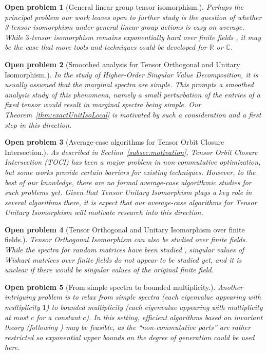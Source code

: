 \documentclass[11pt]{article}
\numberwithin{equation}{section}
\newtheorem{openproblem}{\bf Open problem}
\theoremstyle{remark}
\newcommand{\CC}{\mathbb{C}}
\newcommand{\RR}{\mathbb{R}}
\begin{document}
\begin{openproblem}[General linear group tensor isomorphism.]
Perhaps the principal problem our work leaves open to further study is the question of whether 3-tensor isomorphism under general linear group actions is easy on average. While $3$-tensor isomorphism remains exponentially hard over finite fields \cite{LQ17,BLQW20}, it may be the case that more tools and techniques could be developed for $\RR$ or $\CC$.
\end{openproblem}

\begin{openproblem}[Smoothed analysis for Tensor Orthogonal and Unitary Isomorphism.]
    In the study of Higher-Order Singular Value Decomposition, it is usually assumed that the marginal spectra are simple. This prompts a smoothed analysis \cite{spielman2004smoothed} study of this phenomena, namely a small perturbation of the entries of a fixed tensor would result in marginal spectra being simple. Our Theorem~\ref{thm:exactUnitIsoLocal} is motivated by such a consideration  and a first step in this direction.
\end{openproblem}

\begin{openproblem}[Average-case algorithms for Tensor Orbit Closure Intersection.] As described in Section~\ref{subsec:motivation}, Tensor Orbit Closure Intersection (TOCI) has been a major problem in non-commutative optimization, but some works provide certain barriers for existing techniques. However, to the best of our knowledge, there are no formal average-case algorithmic studies for such problems yet. Given that Tensor Unitary Isomorphism plays a key role in several algorithms there, it is expect that our average-case algorithms for Tensor Unitary Isomorphism will motivate research into this direction.
\end{openproblem}

\begin{openproblem}[Tensor Orthogonal and Unitary Isomorphism over finite fields.]
Tensor Orthogonal Isomorphism can also be studied over finite fields. While the spectra for random matrices have been studied \cite{NEUMANN_PRAEGER_1998,luh2021some}, singular values of Wishart matrices over finite fields do not appear to be studied yet, and it is unclear if there would be singular values of the original finite field.
\end{openproblem}

\begin{openproblem}[From simple spectra to bounded multiplicity.]
Another intriguing problem is to relax from simple spectra (each eigenvalue appearing with multiplicity $1$) to bounded multiplicity (each eigenvalue appearing with multiplicity at most $c$ for a constant $c$). In this setting, efficient algorithms based on invariant theory (following \cite{burgisser_et_alCCC.2021.32}) may be feasible, as the ``non-commutative parts'' are rather restricted so exponential upper bounds on the degree of generation \cite{derksen2001polynomial} could be used here.
\end{openproblem}
\end{document}
